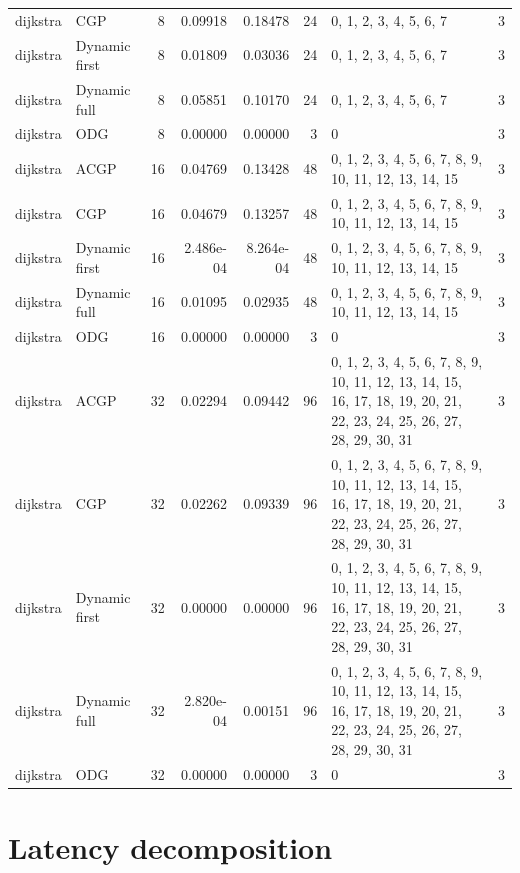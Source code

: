 \documentclass[10pt,a4paper]{article}
\begin{document}
\begin{longtable}{@{}p{23mm}p{29mm}rrrrp{36mm}r@{}}
dijkstra & CGP & 8 & 0.09918 & 0.18478 & 24 & 0, 1, 2, 3, 4, 5, 6, 7 & 3 \\
dijkstra & Dynamic first & 8 & 0.01809 & 0.03036 & 24 & 0, 1, 2, 3, 4, 5, 6, 7 & 3 \\
dijkstra & Dynamic full & 8 & 0.05851 & 0.10170 & 24 & 0, 1, 2, 3, 4, 5, 6, 7 & 3 \\
dijkstra & ODG & 8 & 0.00000 & 0.00000 & 3 & 0 & 3 \\
dijkstra & ACGP & 16 & 0.04769 & 0.13428 & 48 & 0, 1, 2, 3, 4, 5, 6, 7, 8, 9, 10, 11, 12, 13, 14, 15 & 3 \\
dijkstra & CGP & 16 & 0.04679 & 0.13257 & 48 & 0, 1, 2, 3, 4, 5, 6, 7, 8, 9, 10, 11, 12, 13, 14, 15 & 3 \\
dijkstra & Dynamic first & 16 & 2.486e-04 & 8.264e-04 & 48 & 0, 1, 2, 3, 4, 5, 6, 7, 8, 9, 10, 11, 12, 13, 14, 15 & 3 \\
dijkstra & Dynamic full & 16 & 0.01095 & 0.02935 & 48 & 0, 1, 2, 3, 4, 5, 6, 7, 8, 9, 10, 11, 12, 13, 14, 15 & 3 \\
dijkstra & ODG & 16 & 0.00000 & 0.00000 & 3 & 0 & 3 \\
dijkstra & ACGP & 32 & 0.02294 & 0.09442 & 96 & 0, 1, 2, 3, 4, 5, 6, 7, 8, 9, 10, 11, 12, 13, 14, 15, 16, 17, 18, 19, 20, 21, 22, 23, 24, 25, 26, 27, 28, 29, 30, 31 & 3 \\
dijkstra & CGP & 32 & 0.02262 & 0.09339 & 96 & 0, 1, 2, 3, 4, 5, 6, 7, 8, 9, 10, 11, 12, 13, 14, 15, 16, 17, 18, 19, 20, 21, 22, 23, 24, 25, 26, 27, 28, 29, 30, 31 & 3 \\
dijkstra & Dynamic first & 32 & 0.00000 & 0.00000 & 96 & 0, 1, 2, 3, 4, 5, 6, 7, 8, 9, 10, 11, 12, 13, 14, 15, 16, 17, 18, 19, 20, 21, 22, 23, 24, 25, 26, 27, 28, 29, 30, 31 & 3 \\
dijkstra & Dynamic full & 32 & 2.820e-04 & 0.00151 & 96 & 0, 1, 2, 3, 4, 5, 6, 7, 8, 9, 10, 11, 12, 13, 14, 15, 16, 17, 18, 19, 20, 21, 22, 23, 24, 25, 26, 27, 28, 29, 30, 31 & 3 \\
dijkstra & ODG & 32 & 0.00000 & 0.00000 & 3 & 0 & 3 \\
\end{longtable}\normalsize\setlength{\tabcolsep}{6pt}
\clearpage
\section*{Latency decomposition}
\clearpage
\end{document}
